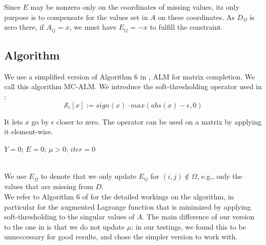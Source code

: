 \documentclass[10pt,conference,compsocconf]{IEEEtran}
\begin{document}
Since $E$ may be nonzero only on the coordinates of missing values, its only purpose is to compensate for the values set in $A$ on these coordinates. As $D_{\Omega}$ is zero there, if $A_{ij} = x$, we must have $E_{ij} = -x$ to fulfill the constraint. \\

\subsection{Algorithm}

We use a simplified version of Algorithm 6 in \cite{almpaper}, ALM for matrix completion. We call this algorithm MC-ALM. We introduce the soft-thresholding operator used in \cite{almpaper}: \\

$$\mathcal{S}_{\epsilon}[x] := sign(x) \cdot max(abs(x) - \epsilon, 0)$$

It lets $x$ go by $\epsilon$ closer to zero. The operator can be used on a matrix by applying it element-wise. 


\begin{algorithm}
$Y = 0$; $E = 0$; $\mu > 0$; $iter = 0$ \\
\ \\

\end{algorithm}

We use $E_{\bar{\Omega}}$ to denote that we only update $E_{ij}$ for $(i, j) \notin \Omega$, e.g., only the values that are missing from $D$. \\

We refer to Algorithm 6 of \cite{almpaper} for the detailed workings on the algorithm, in particular for the augmented Lagrange function that is minimized by applying soft-thresholding to the singular values of $A$. The main difference of our version to the one in \cite{almpaper} is
that we do not update $\mu$; in our testings, we found this to be unneccessary for good results, and chose the simpler version to work with.
\end{document}
